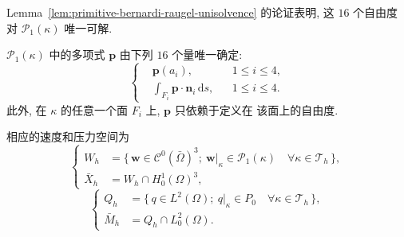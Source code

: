 Lemma~\ref{lem:primitive-bernardi-raugel-unisolvence} 的论证表明,
这 $16$ 个自由度对 $\mathcal{P}_1(\kappa)$ 唯一可解.

\setcounter{statement}{6}
\begin{Lemma}\label{lem:primitive-tetrahedron-first-unisolvence}
$\mathcal{P}_1(\kappa)$ 中的多项式 $\mathbf p$ 由下列 $16$ 个量唯一确定:
\begin{equation}\label{eq:primitive-tetrahedron-first-dofs}
\left\{
\begin{aligned}
&\mathbf p(a_i),&&1\leq i\leq4,\\
&\int_{F_i}\mathbf p\cdot\mathbf n_i\,\mathrm ds,
&&1\leq i\leq4.
\end{aligned}
\right.
\end{equation}
此外, 在 $\kappa$ 的任意一个面 $F_i$ 上, $\mathbf p$ 只依赖于定义在
该面上的自由度.
\end{Lemma}

相应的速度和压力空间为
\begin{equation}\label{eq:primitive-tetrahedron-first-velocity-spaces}
\left\{
\begin{aligned}
W_h&=\{\,\mathbf w\in\mathcal{C}^0(\bar\Omega)^3;
\ \mathbf w|_\kappa\in\mathcal{P}_1(\kappa)
\quad\forall\kappa\in\mathcal{T}_h\,\},\\
\bar X_h&=W_h\cap H_0^1(\Omega)^3,
\end{aligned}
\right.
\end{equation}
\begin{equation}\label{eq:primitive-tetrahedron-first-pressure-spaces}
\left\{
\begin{aligned}
Q_h&=\{\,q\in L^2(\Omega);
\ q|_\kappa\in P_0\quad\forall\kappa\in\mathcal{T}_h\,\},\\
\bar M_h&=Q_h\cap L_0^2(\Omega).
\end{aligned}
\right.
\end{equation}
